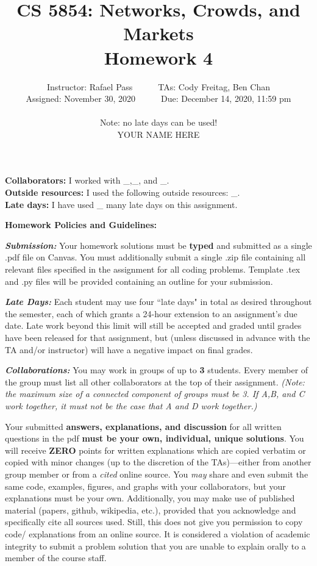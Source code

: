\documentclass[11pt,letterpaper]{article}
\title{CS 5854: Networks, Crowds, and Markets\\ Homework 4}
\author{Instructor: Rafael Pass\ \ \ \ \ \ TAs: Cody Freitag, Ben Chan
\medskip \\
Assigned: November 30, 2020\ \ \ \ \ \ Due: December 14, 2020, 11:59 pm \\ \\
Note: no late days can be used! \bigskip \\ 
\iftemplate
YOUR NAME HERE
\fi
}
\date{}
\newif \iftemplate \templatetrue
\theoremstyle{definition}
\begin{document}
\maketitle

\iftemplate
\noindent 
\textbf{Collaborators:} I worked with \_,\_, and \_. \\
\noindent
\textbf{Outside resources:} I used the following outside resources: \_. \\
\noindent
\textbf{Late days:} I have used \_ many late days on this assignment.
\bigskip
\fi

\iftemplate
\else
\noindent
\textbf{Homework Policies and Guidelines:}
\medskip

\begin{footnotesize}

\emph{\textbf{Submission:}} 
Your homework solutions must be \textbf{typed} and submitted
as a single .pdf file on Canvas. 
You must additionally submit a single .zip file containing all relevant files specified in 
the assignment for all coding problems.
Template .tex and .py files will be provided containing an outline for your submission.

\emph{\textbf{Late Days:}} 
Each student may use four ``late days" in total as desired throughout the semester, each of which grants a 24-hour extension to an assignment's 
due date. Late work beyond this limit will still be accepted and 
graded until grades have been released for that assignment, but (unless discussed in 
advance with the TA and/or instructor) will have a negative impact on final grades.

\emph{\textbf{Collaborations:}}
You may work in groups of up to \textbf{3} students. Every member of the group must list all other collaborators
at the top of their assignment. \emph{(Note: the maximum size of a connected component
of groups must be 3. If A,B, and C work together, it must not be the case that A and D work together.)}

Your submitted \textbf{answers, explanations, and discussion} for all written questions in the pdf \textbf{must be your own, individual, unique solutions}. You will receive \textbf{ZERO} points for written explanations which are copied verbatim or copied with minor changes (up to the discretion of the TAs)---either from another group member or from a \emph{cited} online source.
You \emph{may} share and even submit the same code, examples, figures, and graphs with your collaborators, but your explanations must be your own.
Additionally, you may make use of published material (papers, github, wikipedia, etc.), provided that you acknowledge and specifically cite all sources used.
Still, this does not give you permission to copy code/ explanations from an online source.
It is considered a violation of academic integrity to submit a problem solution that you are unable to explain orally to a member of the course staff.


\end{footnotesize}
\end{document}

